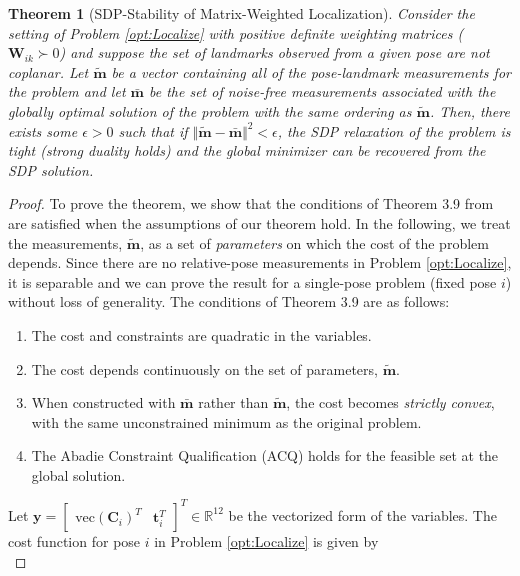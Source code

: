 \documentclass[lettersize,journal]{IEEEtran}
\newcommand{\vect}[1]{\mbox{vec}(#1)}
\newtheorem{theorem}{Theorem}
\begin{document}
\begin{theorem}[SDP-Stability of Matrix-Weighted Localization]
Consider the setting of Problem \eqref{opt:Localize} with positive definite weighting matrices ($ \bm{W}_{ik} \succ 0$) and suppose the set of landmarks observed from a given pose are not coplanar. Let $\tilde{\bm{m}}$ be a vector containing all of the pose-landmark measurements for the problem and let $\bar{\bm{m}}$ be the set of noise-free measurements associated with the globally optimal solution of the problem with the same ordering as $\tilde{\bm{m}}$. Then, there exists some $\epsilon > 0$ such that if $\Vert \tilde{\bm{m}} - \bar{\bm{m}} \Vert^2 < \epsilon $, the SDP relaxation of the problem is tight (strong duality holds) and the global minimizer can be recovered from the SDP solution.
\end{theorem}
\begin{proof}
To prove the theorem, we show that the conditions of Theorem 3.9 from \cite{cifuentesLocalStabilitySemidefinite2022} are satisfied when the assumptions of our theorem hold. In the following, we treat the measurements, $\tilde{\bm{m}}$, as a set of \emph{parameters} on which the cost of the problem depends. Since there are no relative-pose measurements in Problem \eqref{opt:Localize}, it is separable and we can prove the result for a single-pose problem (fixed pose $i$) without loss of generality.
The conditions of Theorem 3.9 are as follows:
\begin{enumerate}
	\item The cost and constraints are quadratic in the variables. \label{thm1:cond1}
	\item The cost depends continuously on the set of parameters, $\tilde{\bm{m}}$. \label{thm1:cond2}
	\item When constructed with $\bar{\bm{m}}$ rather than $\tilde{\bm{m}}$, the cost becomes \emph{strictly convex}, with the same unconstrained minimum as the original problem.\label{thm1:cond3}
	\item The Abadie Constraint Qualification (ACQ) holds for the feasible set at the global solution. \label{thm1:cond4}
\end{enumerate}
Let $\bm{y} = \begin{bmatrix}\vect{\bm{C}_i}^T & \bm{t}_i^T \end{bmatrix}^T \in\mathbb{R}^{12}$ be the vectorized form of the variables.
The cost function for pose $i$ in Problem \eqref{opt:Localize} is given by 
\begin{equation}\label{eqn:LocCost}

\end{equation}
\end{proof}
\end{document}
